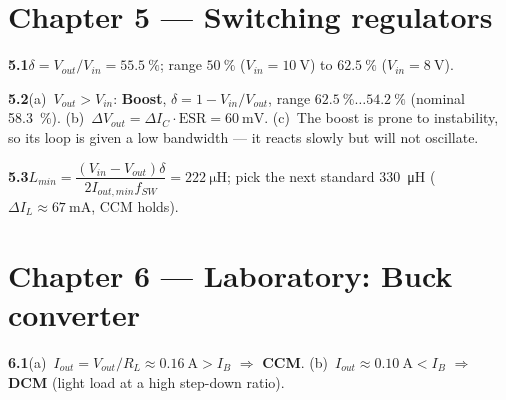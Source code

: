 \documentclass[11pt,a4paper,oneside]{book}
\newcommand{\ans}[1]{\par\smallskip\noindent\textbf{#1}\quad\ignorespaces}
\begin{document}
\section*{Chapter 5 --- Switching regulators}
\ans{5.1}$\delta=V_{out}/V_{in}=\qty{55.5}{\percent}$; range
$\qty{50}{\percent}$ ($V_{in}=\qty{10}{\volt}$) to $\qty{62.5}{\percent}$
($V_{in}=\qty{8}{\volt}$).
\ans{5.2}(a)~$V_{out}>V_{in}$: \textbf{Boost}, $\delta=1-V_{in}/V_{out}$, range
$\qty{62.5}{\percent}\dots\qty{54.2}{\percent}$ (nominal \qty{58.3}{\percent}).
(b)~$\Delta V_{out}=\Delta I_C\cdot\text{ESR}=\qty{60}{\milli\volt}$.
(c)~The boost is prone to instability, so its loop is given a low bandwidth ---
it reacts slowly but will not oscillate.
\ans{5.3}$L_{min}=\dfrac{(V_{in}-V_{out})\delta}{2I_{out,min}f_{SW}}
=\qty{222}{\micro\henry}$; pick the next standard \qty{330}{\micro\henry}
($\Delta I_L\approx\qty{67}{\milli\ampere}$, CCM holds).

\section*{Chapter 6 --- Laboratory: Buck converter}
\ans{6.1}(a)~$I_{out}=V_{out}/R_L\approx\qty{0.16}{\ampere}>I_B$ $\Rightarrow$
\textbf{CCM}. (b)~$I_{out}\approx\qty{0.10}{\ampere}<I_B$ $\Rightarrow$
\textbf{DCM} (light load at a high step-down ratio).
\end{document}
